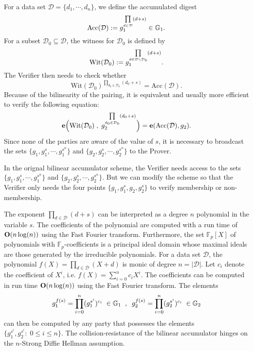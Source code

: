 \documentclass[a4paper, 11pt]{scrreprt}
\numberwithin{equation}{section}
\newcommand{\bFp}{\mathbb{F}_p}
\newcommand{\mc}{\mathcal}
\newcommand{\mb}{\mathbb}
\newcommand{\mr}{\mathrm}
\newcommand{\sub}{\subseteq}
\newcommand{\vs}{\vspace{-2mm}}
\theoremstyle{plain}
\begin{document}
For a data set $\mc{D} = \{d_1,\cdots, d_n\}$, we define the accumulated digest \vs $$\mr{Acc}(\mc{D}):= g_1^{\prod\limits_{d\in \mc{D}} (d+s)} \in \mb{G}_1. \vs $$ For a subset $\mc{D}_0\sub \mc{D}$, the witness for $\mc{D}_0$ is defined by \vs $$\mr{Wit}(\mc{D}_0) := g_1^{\prod\limits_{d\in \mc{D}\setminus \mc{D}_0} (d+s)}. \vs $$ The Verifier then needs to check whether \vs $$\mr{Wit}(\mc{D}_0)^{\prod\limits_{d_0\in \mc{D}_0} (d_0+s)} = \mr{Acc}(\mc{D}).$$ Because of the bilinearity of the pairing, it is equivalent and usually more efficient to verify the following equation: \vs $${\bf{e}}\Big(\mr{Wit}(\mc{D}_0)\;,\; g_2^{\prod\limits_{d_0\in \mc{D}_0} (d_0+s)}\Big) = {\bf{e}}(\mr{Acc}(\mc{D}), g_2). \vs $$ Since none of the parties are aware of the value of $s$, it is necessary to broadcast the sets $\{g_1, g_1^s,\cdots , g_1^{s^n}\}$ and $\{g_2, g_2^s,\cdots , g_2^{s^n}\}$ to the Prover.

In the orignal bilinear accumulator scheme, the Verifier needs access to the sets $\{g_1, g_1^s,\cdots , g_1^{s^n}\}$ and $\{g_2, g_2^s,\cdots , g_2^{s^n}\}$. But we can modify the scheme so that the Verifier only needs the four points $\{g_1,g_1^s, g_2, g_2^s \}$ to verify membership or non-membership.

The exponent $\prod\limits_{d\in \mc{D}} (d+s)$ can be interpreted as a degree $n$ polynomial in the variable $s$. The coefficients of the polynomial are computed with a run time of ${\bf{O}} (n\log(n))$ using the Fast Fourier transform. Furthermore, the set $\bFp[X]$ of polynomials with $\bFp$-coefficients is a principal ideal domain whose maximal ideals are those generated by the irreducible polynomials. For a data set $\mc{D}$, the polynomial $f(X) = \prod\limits_{d\in \mc{D}}(X+d)$ is monic of degree $n = |\mc{D}|$. Let $c_i$ denote the coefficient of $X^i$, i.e. $f(X) = \sum\limits_{i=0}^n c_iX^i$. The coefficients can be computed in run time ${\bf{O}}(n\log(n))$ using the Fast Fourier transform. The elements \vs $$g_1^{f(s)} = \prod\limits_{i=0}^n (g_1^{s^i})^{c_i}\;\in\mb{G}_1\;\;,\;\;g_2^{f(s)} = \prod\limits_{i=0}^n (g_2^{s^i})^{c_i}\;\in\mb{G}_2 \vs $$ can then be computed by any party that possesses the elements $\{g_1^{s^i}, g_2^{s^i} :\; 0\leq i \leq n  \}$. The collision-resistance of the bilinear accumulator hinges on the $n$-Strong Diffie Hellman assumption. 
\end{document}
